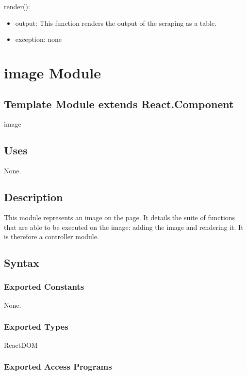 \documentclass[12pt, titlepage]{article}
\begin{document}
\noindent render():
\begin{itemize}
\item output: This function renders the output of the scraping as a table.
\item exception: none
\end{itemize}

\newpage

\section{image Module}

\subsection{Template Module extends React.Component}

image

\subsection{Uses}

None.

\subsection{Description}
This module represents an image on the page. It details the suite of functions that are able to be executed on the image: adding the image and rendering it. It is therefore a controller module.

\subsection{Syntax}

\subsubsection{Exported Constants}

None.

\subsubsection{Exported Types}

ReactDOM

\subsubsection{Exported Access Programs}
\end{document}
